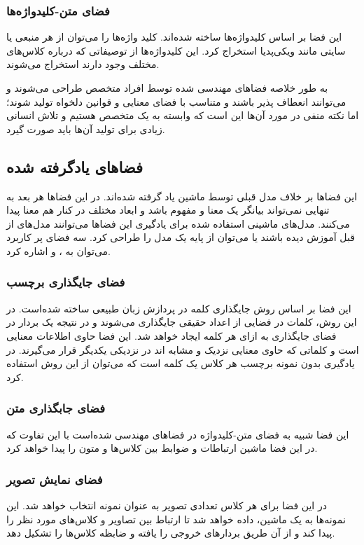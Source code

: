 \subsubsection{‌فضای متن-کلیدواژه‌ها}
این فضا بر اساس کلید‌واژه‌ها ساخته شده‌اند. کلید واژه‌ها را می‌توان از هر منبعی یا سایتی مانند ویکی‌پدیا استخراج کرد. این کلیدواژه‌ها از توصیفاتی که درباره کلاس‌های مختلف وجود دارند استخراج می‌شوند. 

به طور خلاصه فضا‌های مهندسی شده توسط افراد متخصص طراحی می‌شوند و می‌توانند انعطاف‌ پذیر باشند و متناسب با فضای معنایی و قوانین دلخواه تولید شوند؛ اما نکته منفی در مورد آن‌ها این است که وابسته به یک متخصص هستیم و تلاش انسانی زیادی برای تولید آن‌‌ها باید صورت گیرد.

\subsection{فضاهای یادگرفته شده}
این فضا‌ها بر خلاف مدل قبلی توسط ماشین یاد گرفته شده‌اند. در این فضا‌ها هر بعد به تنهایی نمی‌تواند بیانگر یک معنا و مفهوم باشد و ابعاد مختلف در کنار هم معنا پیدا می‌کنند. مدل‌های ماشینی استفاده شده برای یادگیری این فضا‌ها می‌توانند مدل‌های از قبل آموزش دیده باشند یا می‌توان از پایه یک مدل را طراحی کرد. سه فضای پر کاربرد می‌توان به 
، 
 و 
اشاره کرد.

\subsubsection{‌فضای جایگذاری برچسب}
این فضا بر اساس روش جایگذاری کلمه در پردازش زبان طبیعی ساخته شده‌است. در این روش، کلمات در فضایی از اعداد حقیقی جایگذاری می‌شوند و در نتیجه یک بردار در فضای جایگذاری به ازای هر کلمه ایجاد خواهد شد. این فضا حاوی اطلاعات معنایی است و کلماتی که حاوی معنایی نزدیک و مشابه اند در نزدیکی یکدیگر قرار می‌گیرند.
در یادگیری بدون نمونه برچسب هر کلاس یک کلمه است که می‌توان از این روش استفاده کرد.
\subsubsection{‌فضای جابگذاری متن}
این فضا شبیه به فضای متن-کلیدواژه در فضاهای مهندسی شده‌است با این تفاوت که در این فضا ماشین ارتباطات و ضوابط بین کلاس‌ها و متون را پیدا خواهد کرد.
\subsubsection{‌فضای نمایش تصویر}
در این فضا برای هر کلاس تعدادی تصویر به عنوان نمونه انتخاب خواهد شد. این نمونه‌ها به یک ماشین، داده خواهد شد تا ارتباط بین تصاویر و کلاس‌های مورد نظر را پیدا کند و از آن طریق بردارهای خروجی را یافته و ضابظه کلاس‌ها را تشکیل دهد.

